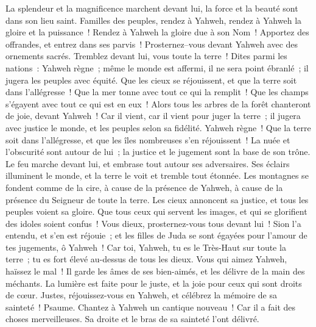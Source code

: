 \begin{multicols}{2}
La splendeur et la magnificence marchent devant lui, la force et la beauté sont dans son lieu saint.
Familles des peuples, rendez à Yahweh, rendez à Yahweh la gloire et la puissance~!
Rendez à Yahweh la gloire due à son Nom~! Apportez des offrandes, et entrez dans ses parvis~!
Prosternez–vous devant Yahweh avec des ornements sacrés. Tremblez devant lui, vous toute la terre~!
Dites parmi les nations~: Yahweh règne~; même le monde est affermi, il ne sera point ébranlé~; il jugera les peuples avec équité.
Que les cieux se réjouissent, et que la terre soit dans l'allégresse~! Que la mer tonne avec tout ce qui la remplit~!
Que les champs s'égayent avec tout ce qui est en eux~! Alors tous les arbres de la forêt chanteront de joie,
devant Yahweh~! Car il vient, car il vient pour juger la terre~; il jugera avec justice le monde, et les peuples selon sa fidélité.
\VerseOne{}Yahweh règne~! Que la terre soit dans l'allégresse, et que les îles nombreuses s'en réjouissent~!
La nuée et l'obscurité sont autour de lui~; la justice et le jugement sont la base de son trône.
Le feu marche devant lui, et embrase tout autour ses adversaires.
Ses éclairs illuminent le monde, et la terre le voit et tremble tout étonnée.
Les montagnes se fondent comme de la cire, à cause de la présence de Yahweh, à cause de la présence du Seigneur de toute la terre.
Les cieux annoncent sa justice, et tous les peuples voient sa gloire.
Que tous ceux qui servent les images, et qui se glorifient des idoles soient confus~! Vous dieux, prosternez-vous tous devant lui~!
Sion l'a entendu, et s'en est réjouie~; et les filles de Juda se sont égayées pour l'amour de tes jugements, ô Yahweh~!
Car toi, Yahweh, tu es le Très-Haut sur toute la terre~; tu es fort élevé au-dessus de tous les dieux.
Vous qui aimez Yahweh, haïssez le mal~! Il garde les âmes de ses bien-aimés, et les délivre de la main des méchants.
La lumière est faite pour le juste, et la joie pour ceux qui sont droits de cœur.
Justes, réjouissez-vous en Yahweh, et célébrez la mémoire de sa sainteté~!
\VerseOne{}Psaume. Chantez à Yahweh un cantique nouveau~! Car il a fait des choses merveilleuses. Sa droite et le bras de sa sainteté l'ont délivré.

\end{multicols}
